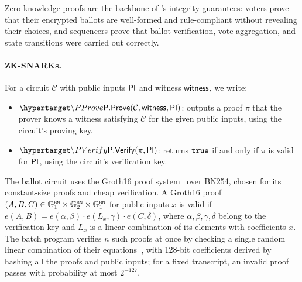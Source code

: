 Zero-knowledge proofs are the backbone of \davinci's integrity guarantees: voters prove that their encrypted ballots are well-formed and rule-compliant without revealing their choices, and sequencers prove that ballot verification, vote aggregation, and state transitions were carried out correctly.

\paragraph{\acp{ZK-SNARK}.} For a circuit $\mathcal{C}$ with public inputs ${\sf{PI}}$ and witness ${\sf{witness}}$, we write:
\begin{itemize}
	\item $\hlset{\PProve}(\mathcal{C}, \witness, \publicinputs)$: outputs a proof $\pi$ that the prover knows a witness satisfying $\mathcal{C}$ for the given public inputs, using the circuit's proving key.
	\item $\hlset{\PVerify}(\pi, \publicinputs)$: returns $\texttt{true}$ if and only if $\pi$ is valid for ${\sf{PI}}$, using the circuit's verification key.
\end{itemize}
The ballot circuit uses the Groth16 proof system~\cite{groth2016size} over BN254, chosen for its constant-size proofs and cheap verification. A Groth16 proof $(A, B, C) \in {\mathbb{G}}^{\text{\tiny \sf BN}}_1 \times {\mathbb{G}}^{\text{\tiny \sf BN}}_2 \times {\mathbb{G}}^{\text{\tiny \sf BN}}_1$ for public inputs $x$ is valid if $e(A, B) = e(\alpha, \beta) \cdot e(L_x, \gamma) \cdot e(C, \delta)$, where $\alpha, \beta, \gamma, \delta$ belong to the verification key and $L_x$ is a linear combination of its elements with coefficients $x$. The batch program verifies $n$ such proofs at once by checking a single random linear combination of their equations~\cite{bellare1998batch}, with 128-bit coefficients derived by hashing all the proofs and public inputs; for a fixed transcript, an invalid proof passes with probability at most $2^{-127}$.


